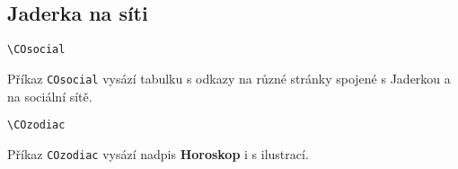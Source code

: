\documentclass[a4paper]{article}
\begin{document}
\subsection{Jaderka na síti}
\begin{verbatim}
\COsocial
\end{verbatim}
Příkaz \texttt{COsocial} vysází tabulku s odkazy na různé stránky spojené s Jaderkou a na sociální sítě.
\begin{verbatim}
\COzodiac
\end{verbatim}
Příkaz \texttt{COzodiac} vysází nadpis \textbf{Horoskop} i s ilustrací.
\end{document}
